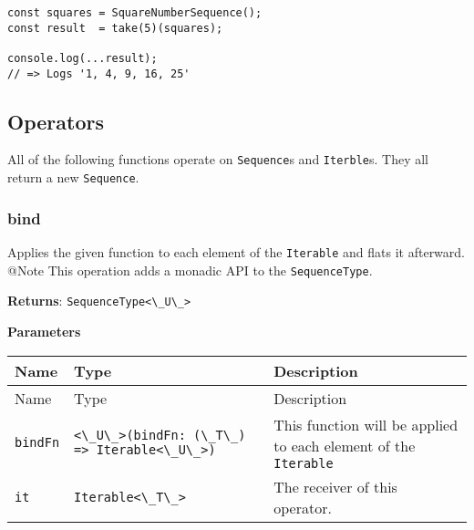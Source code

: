 \begin{lstlisting}[label=c165f899-ffa4-43ac-bf8a-3fe162f8bcb1]
const squares = SquareNumberSequence();
const result  = take(5)(squares);
                                       
console.log(...result);
// => Logs '1, 4, 9, 16, 25'
\end{lstlisting}

\hypertarget{569b08a0-06b3-45e3-b4e9-576f534c5301}{%
\subsection{Operators}\label{sub:appendix_operators} }

All of the following functions operate on
\passthrough{\lstinline!Sequence!}s and
\passthrough{\lstinline!Iterble!}s. They all return a new
\passthrough{\lstinline!Sequence!}.

\hypertarget{ac6d2b03-9c43-4e0e-8308-92102a526003}{%
\subsubsection{bind}\label{ac6d2b03-9c43-4e0e-8308-92102a526003}}

Applies the given function to each element of the
\passthrough{\lstinline!Iterable!} and flats it afterward. @Note This
operation adds a monadic API to the
\passthrough{\lstinline!SequenceType!}.

\textbf{Returns}: \passthrough{\lstinline!SequenceType<\_U\_>!}

\textbf{Parameters}

\begin{longtable}[]{
  >{\raggedright\arraybackslash}p{}
  >{\raggedright\arraybackslash}p{}
  >{\raggedright\arraybackslash}p{}@{}}

\toprule\noalign{}
Name & Type & Description \\
\midrule\noalign{}
\endfirsthead
\toprule\noalign{}
Name & Type & Description \\
\midrule\noalign{}
\endhead
\bottomrule\noalign{}
\endlastfoot
\passthrough{\lstinline!bindFn!} &
\passthrough{\lstinline!<\_U\_>(bindFn: (\_T\_) => Iterable<\_U\_>)!} &
This function will be applied to each element of the
\passthrough{\lstinline!Iterable!} \\
\passthrough{\lstinline!it!} & \passthrough{\lstinline!Iterable<\_T\_>!}
& The receiver of this operator. \\
\end{longtable}

